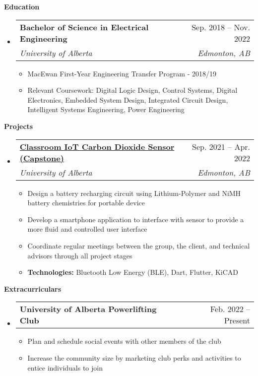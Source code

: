 \documentclass[letterpaper,12pt]{article}[leftmargin=*]
\makeatletter
\def \entryspacing {-0pt}
\renewcommand{\section}[2]{\vspace{5pt}
  \colorbox{secondary}{\color{white}\raggedbottom\normalsize\textbf{{#1}{\hspace{7pt}#2}}}
}
\newcommand{\resumeEntryStart}{\begin{itemize}[leftmargin=2.5mm]}
\newcommand{\resumeEntryEnd}{\end{itemize}\vspace{\entryspacing}}
\newcommand{\resumeItemListStart}{\begin{itemize}[leftmargin=4.5mm]}
\newcommand{\resumeItemListEnd}{\end{itemize}}
\newcommand{\resumeItem}[1]{
  \item\small{
    {#1 \vspace{-2pt}}
  }
}
\newcommand{\resumeEntryTSDL}[4]{
  \vspace{-1pt}\item[]
    \begin{tabularx}{0.97\textwidth}{X@{\hspace{60pt}}r}
      \textbf{\color{primary}#1} & {\firabook\color{accent}\small#2} \\
      \textit{\color{accent}\small#3} & \textit{\color{accent}\small#4} \\
    \end{tabularx}\vspace{-6pt}
}
\newcommand{\resumeEntryTD}[2]{
  \vspace{-1pt}\item[]
    \begin{tabularx}{0.97\textwidth}{X@{\hspace{60pt}}r}
      \textbf{\color{primary}#1} & {\firabook\color{accent}\small#2} \\
    \end{tabularx}\vspace{-6pt}
}
\makeatother
\begin{document}
\section{\faGraduationCap}{Education}

  \resumeEntryStart
    \resumeEntryTSDL
      {Bachelor of Science in Electrical Engineering}{Sep. 2018 -- Nov. 2022}
      {University of Alberta}{Edmonton, AB}
  \resumeItemListStart
    \resumeItem{MacEwan First-Year Engineering Transfer Program - 2018/19}
    \resumeItem{Relevant Coursework: Digital Logic Design, Control Systems, Digital Electronics, Embedded System Design, Integrated Circuit Design, Intelligent Systems Engineering, Power Engineering}
  \resumeItemListEnd
  \resumeEntryEnd

\section{\faFlask}{Projects}

  \resumeEntryStart
    \resumeEntryTSDL
      {\href{https://github.com/EE-Team10-Capstone}{\color{black}Classroom IoT Carbon Dioxide Sensor (Capstone)}}{Sep. 2021 -- Apr. 2022}
      {University of Alberta}{Edmonton, AB}
    \resumeItemListStart
      \resumeItem {Design a battery recharging circuit using Lithium-Polymer and NiMH battery chemistries for portable device}
      \resumeItem {Develop a smartphone application to interface with sensor to provide a more fluid and controlled user interface}
      \resumeItem {Coordinate regular meetings between the group, the client, and technical advisors through all project stages}
      \resumeItem {\textbf{Technologies:} Bluetooth Low Energy (BLE), Dart, Flutter, KiCAD}
    \resumeItemListEnd
  \resumeEntryEnd

\section{\faGroup}{Extracurriculars}

 \resumeEntryStart
  \resumeEntryTD{University of Alberta Powerlifting Club}{Feb. 2022 -- Present}
    \resumeItemListStart
      \resumeItem{Plan and schedule social events with other members of the club}
      \resumeItem{Increase the community size by marketing club perks and activities to entice individuals to join} 
    \resumeItemListEnd
 \resumeEntryEnd
\end{document}
